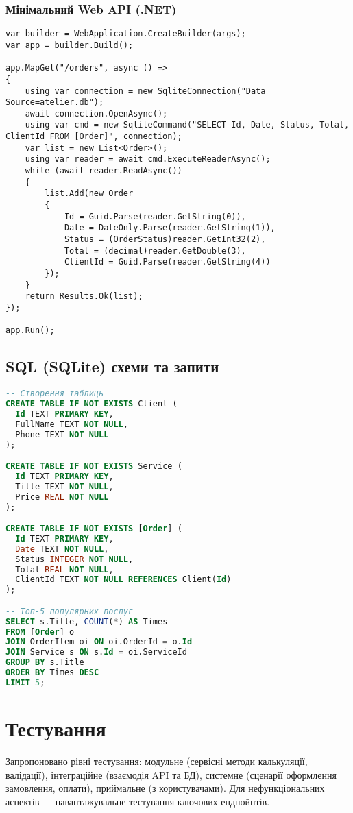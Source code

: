 \documentclass[14pt,a4paper]{extarticle}
\begin{document}
\subsubsection*{Мінімальний Web API (.NET)}
\begin{lstlisting}[language=CSharp,caption={Мінімальний ендпойнт для замовлень}]
var builder = WebApplication.CreateBuilder(args);
var app = builder.Build();

app.MapGet("/orders", async () =>
{
    using var connection = new SqliteConnection("Data Source=atelier.db");
    await connection.OpenAsync();
    using var cmd = new SqliteCommand("SELECT Id, Date, Status, Total, ClientId FROM [Order]", connection);
    var list = new List<Order>();
    using var reader = await cmd.ExecuteReaderAsync();
    while (await reader.ReadAsync())
    {
        list.Add(new Order
        {
            Id = Guid.Parse(reader.GetString(0)),
            Date = DateOnly.Parse(reader.GetString(1)),
            Status = (OrderStatus)reader.GetInt32(2),
            Total = (decimal)reader.GetDouble(3),
            ClientId = Guid.Parse(reader.GetString(4))
        });
    }
    return Results.Ok(list);
});

app.Run();
\end{lstlisting}

\subsection{SQL (SQLite) схеми та запити}
\begin{lstlisting}[language=SQL,caption={DDL і базові запити для SQLite}]
-- Створення таблиць
CREATE TABLE IF NOT EXISTS Client (
  Id TEXT PRIMARY KEY,
  FullName TEXT NOT NULL,
  Phone TEXT NOT NULL
);

CREATE TABLE IF NOT EXISTS Service (
  Id TEXT PRIMARY KEY,
  Title TEXT NOT NULL,
  Price REAL NOT NULL
);

CREATE TABLE IF NOT EXISTS [Order] (
  Id TEXT PRIMARY KEY,
  Date TEXT NOT NULL,
  Status INTEGER NOT NULL,
  Total REAL NOT NULL,
  ClientId TEXT NOT NULL REFERENCES Client(Id)
);

-- Топ-5 популярних послуг
SELECT s.Title, COUNT(*) AS Times
FROM [Order] o
JOIN OrderItem oi ON oi.OrderId = o.Id
JOIN Service s ON s.Id = oi.ServiceId
GROUP BY s.Title
ORDER BY Times DESC
LIMIT 5;
\end{lstlisting}

\section{Тестування}
Запропоновано рівні тестування: модульне (сервісні методи калькуляції, валідації), інтеграційне (взаємодія API та БД), системне (сценарії оформлення замовлення, оплати), приймальне (з користувачами). Для нефункціональних аспектів — навантажувальне тестування ключових ендпойнтів.
\end{document}
